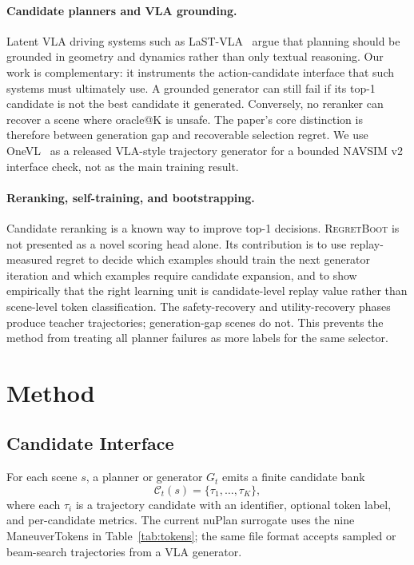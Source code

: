 \documentclass{article}
\newcommand{\method}{\textsc{RegretBoot}}
\begin{document}
\paragraph{Candidate planners and VLA grounding.}
Latent VLA driving systems such as LaST-VLA~\citep{luo2026lastvla} argue that planning
should be grounded in geometry and dynamics rather than only textual reasoning. Our work
is complementary: it instruments the action-candidate interface that such systems must
ultimately use. A grounded generator can still fail if its top-1 candidate is not the best
candidate it generated. Conversely, no reranker can recover a scene where oracle@K is
unsafe. The paper's core distinction is therefore between generation gap and recoverable
selection regret.
We use OneVL~\citep{lu2026onevl} as a released VLA-style trajectory generator for a
bounded NAVSIM v2 interface check, not as the main training result.

\paragraph{Reranking, self-training, and bootstrapping.}
Candidate reranking is a known way to improve top-1 decisions. \method{} is not presented
as a novel scoring head alone. Its contribution is to use replay-measured regret to decide
which examples should train the next generator iteration and which examples require
candidate expansion, and to show empirically that the right learning unit is
candidate-level replay value rather than scene-level token classification. The
safety-recovery and utility-recovery phases produce teacher trajectories; generation-gap
scenes do not. This prevents the method from treating all planner failures as more labels
for the same selector.

\section{Method}
\label{sec:method}

\subsection{Candidate Interface}
\label{sec:method:candidates}

For each scene $s$, a planner or generator $G_t$ emits a finite candidate bank
\[
  \mathcal{C}_t(s)=\{\tau_1,\ldots,\tau_K\},
\]
where each $\tau_i$ is a trajectory candidate with an identifier, optional token label,
and per-candidate metrics. The current nuPlan surrogate uses the nine ManeuverTokens in
Table~\ref{tab:tokens}; the same file format accepts sampled or beam-search trajectories
from a VLA generator.
\end{document}
